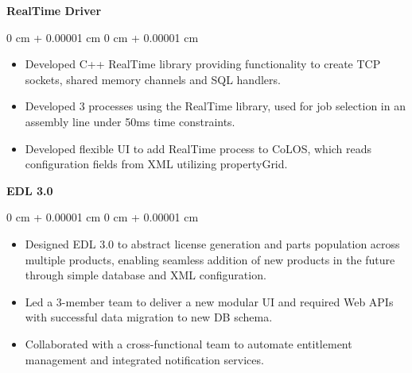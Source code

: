 \documentclass[10pt, letterpaper]{article}
\newenvironment{highlightsForExp}{
    \begin{itemize}[
        topsep=0.05 cm,
        parsep=0.05 cm,
        partopsep=0pt,
        itemsep=0pt,
        leftmargin=0 cm + 14pt
    ]
}{
    \end{itemize}
} %
\newenvironment{onecolentry}{
    \begin{adjustwidth}{
        0 cm + 0.00001 cm
    }{
        0 cm + 0.00001 cm
    }
}{
    \end{adjustwidth}
} %
\begin{document}
\vspace{0.10 cm}


             \vspace{0.10 cm}

        \hspace{2pt}\textbf{RealTime Driver}
        \vspace{0.10 cm}
        \begin{onecolentry}
            \begin{highlightsForExp}
                \item Developed C++ RealTime library providing functionality to create TCP sockets, shared memory channels and SQL handlers.
                \item Developed 3 processes using the RealTime library, used for job selection in an assembly line under 50ms time constraints.
                \item Developed flexible UI to add RealTime process to CoLOS, which reads configuration fields from XML utilizing propertyGrid. 
            \end{highlightsForExp}
        \end{onecolentry}

        \vspace{0.10 cm}
        \hspace{2pt}\textbf{EDL 3.0}
        \vspace{0.10 cm}
        \begin{onecolentry}
            \begin{highlightsForExp}
                \item Designed EDL 3.0 to abstract license generation and parts population across multiple products, enabling seamless addition of new products in the future through simple database and XML configuration.
                \item Led a 3-member team to deliver a new modular UI and required Web APIs with successful data migration to new DB schema.
                \item Collaborated with a cross-functional team to automate entitlement management and integrated notification services.
            \end{highlightsForExp}
        \end{onecolentry}
        
\end{document}
